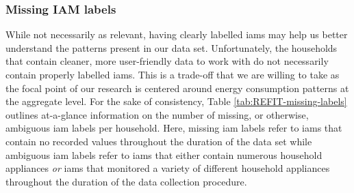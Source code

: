 \subsubsection{Missing IAM labels}
\label{subsubsec:Exploratory-Data-Analysis:REFIT:Issues:Missing-IAM-Labels}
While not necessarily as relevant, having clearly labelled \glspl{iam} may help us better understand the patterns present in our data set. Unfortunately, the households that contain cleaner, more user-friendly data to work with do not necessarily contain properly labelled \glspl{iam}. This is a trade-off that we are willing to take as the focal point of our research is centered around energy consumption patterns at the aggregate level. For the sake of consistency, Table \ref{tab:REFIT-missing-labels} outlines at-a-glance information on the number of missing, or otherwise, ambiguous \gls{iam} labels per household. Here, missing \gls{iam} labels refer to \glspl{iam} that contain no recorded values throughout the duration of the data set while ambiguous \gls{iam} labels refer to \glspl{iam} that either contain numerous household appliances \textit{or} \glspl{iam} that monitored a variety of different household appliances throughout the duration of the data collection procedure.

